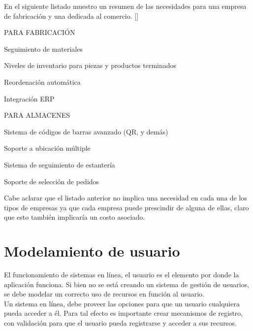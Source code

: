 En el siguiente listado muestro un resumen de las necesidades para una empresa de fabricación y una dedicada al comercio. [\citep{PCD:2019:Online}]

\begin{numerate}
\item PARA FABRICACIÓN
\begin{numerate}
\item Seguimiento de materiales
\item Niveles de inventario para piezas y productos terminados
\item Reordenación automática
\item Integración ERP
\end{numerate}
\item PARA ALMACENES
\begin{numerate}
\item Sistema de códigos de barras avanzado (QR, y demás)
\item Soporte a ubicación múltiple
\item Sistema de seguimiento de estantería
\item Soporte de selección de pedidos
\end{numerate}
\end{numerate}

Cabe aclarar que el listado anterior no implica una necesidad en cada una de los tipos de empresas ya que cada empresa puede prescindir de alguna de ellas, claro que esto también implicaría un costo asociado.

\section{Modelamiento de usuario}

El funcionamiento de sistemas en línea, el usuario es el elemento por donde la aplicación funciona. Si bien no se está creando un sistema de gestión de usuarios, se debe modelar un correcto uso de recursos en función al usuario.\\

Un sistema en línea, debe proveer las opciones para que un usuario cualquiera pueda acceder a él. Para tal efecto es importante crear mecanismos de registro, con validación para que el usuario pueda registrarse y acceder a sus recursos.\\

